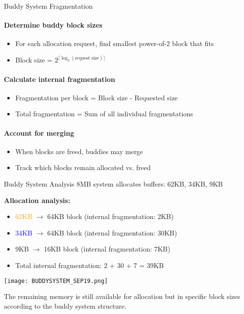 \begin{KR}{Buddy System Fragmentation}
    \paragraph{Determine buddy block sizes}
    \begin{itemize}
        \item For each allocation request, find smallest power-of-2 block that fits
        \item Block size = $2^{\lceil \log_2(\text{request size}) \rceil}$
    \end{itemize}
    
    \paragraph{Calculate internal fragmentation}
    \begin{itemize}
        \item Fragmentation per block = Block size - Requested size
        \item Total fragmentation = Sum of all individual fragmentations
    \end{itemize}
    
    \paragraph{Account for merging}
    \begin{itemize}
        \item When blocks are freed, buddies may merge
        \item Track which blocks remain allocated vs. freed
    \end{itemize}
\end{KR}

\begin{example2}{Buddy System Analysis}
    8MB system allocates buffers: 62KB, 34KB, 9KB
    
    \tcblower
    
    \textbf{Allocation analysis:}
    \begin{itemize}
        \item \textcolor{orange}{62KB} $\rightarrow$ 64KB block (internal fragmentation: 2KB)
        \item \textcolor{blue}{34KB} $\rightarrow$ 64KB block (internal fragmentation: 30KB)
        \item \textcolor{frog}{9KB} $\rightarrow$ 16KB block (internal fragmentation: 7KB)
        \item Total internal fragmentation: 2 + 30 + 7 = 39KB
    \end{itemize}

    \texttt{[image: BUDDYSYSTEM\_SEP19.png]}
    
    The remaining memory is still available for allocation but in specific block sizes according to the buddy system structure.
\end{example2}

